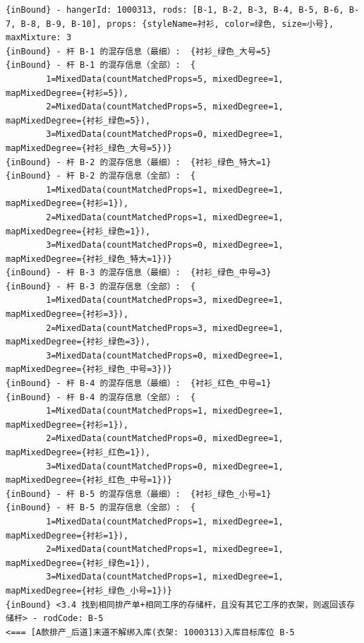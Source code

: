 {\begin{verbatim}
{inBound} - hangerId: 1000313, rods: [B-1, B-2, B-3, B-4, B-5, B-6, B-7, B-8, B-9, B-10], props: {styleName=衬衫, color=绿色, size=小号}, maxMixture: 3
{inBound} - 杆 B-1 的混存信息（最细）:  {衬衫_绿色_大号=5}
{inBound} - 杆 B-1 的混存信息（全部）:  {
		1=MixedData(countMatchedProps=5, mixedDegree=1, mapMixedDegree={衬衫=5}), 
		2=MixedData(countMatchedProps=5, mixedDegree=1, mapMixedDegree={衬衫_绿色=5}), 
		3=MixedData(countMatchedProps=0, mixedDegree=1, mapMixedDegree={衬衫_绿色_大号=5})}
{inBound} - 杆 B-2 的混存信息（最细）:  {衬衫_绿色_特大=1}
{inBound} - 杆 B-2 的混存信息（全部）:  {
		1=MixedData(countMatchedProps=1, mixedDegree=1, mapMixedDegree={衬衫=1}), 
		2=MixedData(countMatchedProps=1, mixedDegree=1, mapMixedDegree={衬衫_绿色=1}), 
		3=MixedData(countMatchedProps=0, mixedDegree=1, mapMixedDegree={衬衫_绿色_特大=1})}
{inBound} - 杆 B-3 的混存信息（最细）:  {衬衫_绿色_中号=3}
{inBound} - 杆 B-3 的混存信息（全部）:  {
		1=MixedData(countMatchedProps=3, mixedDegree=1, mapMixedDegree={衬衫=3}), 
		2=MixedData(countMatchedProps=3, mixedDegree=1, mapMixedDegree={衬衫_绿色=3}), 
		3=MixedData(countMatchedProps=0, mixedDegree=1, mapMixedDegree={衬衫_绿色_中号=3})}
{inBound} - 杆 B-4 的混存信息（最细）:  {衬衫_红色_中号=1}
{inBound} - 杆 B-4 的混存信息（全部）:  {
		1=MixedData(countMatchedProps=1, mixedDegree=1, mapMixedDegree={衬衫=1}), 
		2=MixedData(countMatchedProps=0, mixedDegree=1, mapMixedDegree={衬衫_红色=1}), 
		3=MixedData(countMatchedProps=0, mixedDegree=1, mapMixedDegree={衬衫_红色_中号=1})}
{inBound} - 杆 B-5 的混存信息（最细）:  {衬衫_绿色_小号=1}
{inBound} - 杆 B-5 的混存信息（全部）:  {
		1=MixedData(countMatchedProps=1, mixedDegree=1, mapMixedDegree={衬衫=1}), 
		2=MixedData(countMatchedProps=1, mixedDegree=1, mapMixedDegree={衬衫_绿色=1}), 
		3=MixedData(countMatchedProps=1, mixedDegree=1, mapMixedDegree={衬衫_绿色_小号=1})}
{inBound} <3.4 找到相同排产单+相同工序的存储杆，且没有其它工序的衣架，则返回该存储杆> - rodCode: B-5
<=== [A款排产_后道]末道不解绑入库(衣架: 1000313)入库目标库位 B-5


\end{verbatim}}
